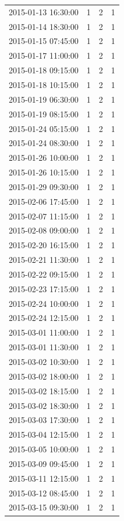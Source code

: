 \begin{tabular}{lrrr}
2015-01-13 16:30:00 & 1 & 2 & 1 \\
2015-01-14 18:30:00 & 1 & 2 & 1 \\
2015-01-15 07:45:00 & 1 & 2 & 1 \\
2015-01-17 11:00:00 & 1 & 2 & 1 \\
2015-01-18 09:15:00 & 1 & 2 & 1 \\
2015-01-18 10:15:00 & 1 & 2 & 1 \\
2015-01-19 06:30:00 & 1 & 2 & 1 \\
2015-01-19 08:15:00 & 1 & 2 & 1 \\
2015-01-24 05:15:00 & 1 & 2 & 1 \\
2015-01-24 08:30:00 & 1 & 2 & 1 \\
2015-01-26 10:00:00 & 1 & 2 & 1 \\
2015-01-26 10:15:00 & 1 & 2 & 1 \\
2015-01-29 09:30:00 & 1 & 2 & 1 \\
2015-02-06 17:45:00 & 1 & 2 & 1 \\
2015-02-07 11:15:00 & 1 & 2 & 1 \\
2015-02-08 09:00:00 & 1 & 2 & 1 \\
2015-02-20 16:15:00 & 1 & 2 & 1 \\
2015-02-21 11:30:00 & 1 & 2 & 1 \\
2015-02-22 09:15:00 & 1 & 2 & 1 \\
2015-02-23 17:15:00 & 1 & 2 & 1 \\
2015-02-24 10:00:00 & 1 & 2 & 1 \\
2015-02-24 12:15:00 & 1 & 2 & 1 \\
2015-03-01 11:00:00 & 1 & 2 & 1 \\
2015-03-01 11:30:00 & 1 & 2 & 1 \\
2015-03-02 10:30:00 & 1 & 2 & 1 \\
2015-03-02 18:00:00 & 1 & 2 & 1 \\
2015-03-02 18:15:00 & 1 & 2 & 1 \\
2015-03-02 18:30:00 & 1 & 2 & 1 \\
2015-03-03 17:30:00 & 1 & 2 & 1 \\
2015-03-04 12:15:00 & 1 & 2 & 1 \\
2015-03-05 10:00:00 & 1 & 2 & 1 \\
2015-03-09 09:45:00 & 1 & 2 & 1 \\
2015-03-11 12:15:00 & 1 & 2 & 1 \\
2015-03-12 08:45:00 & 1 & 2 & 1 \\
2015-03-15 09:30:00 & 1 & 2 & 1 \\

\end{tabular}
